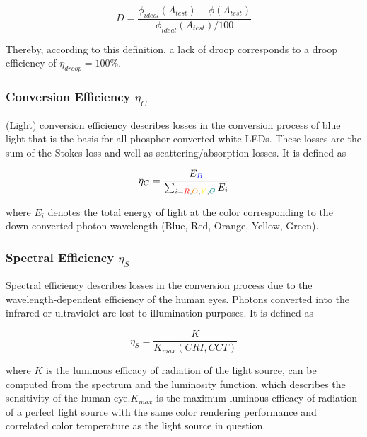 \documentclass[twoside,twocolumn,9pt]{article}
\begin{document}
\begin{equation}
\label{eqn:droop}
    D = \frac{\phi_{ideal}(A_{test})-\phi(A_{test})}{\phi_{ideal}(A_{test})/100}
\end{equation}

Thereby, according to this definition, a lack of droop corresponds to a droop efficiency of $\eta_{droop} = 100\%$\cite{schubert2018light}\cite{tsao2010solid}.

\subsubsection{Conversion Efficiency $\eta_{C}$}

(Light) conversion efficiency describes losses in the conversion process of blue light that is the basis for all phosphor-converted white LEDs. These losses are the sum of the Stokes loss and well as scattering/absorption losses. It is defined as

\begin{equation}
    \eta_{C} = \frac{E_{\textcolor{blue}{B}}}{\sum_{i=\textcolor{red}{R},\textcolor{orange}{O},\textcolor{yellow}{Y},\textcolor{teal}{G}} E_i}
\end{equation}

where $E_i$ denotes the total energy of light at the color corresponding to the down-converted photon wavelength (Blue, Red, Orange, Yellow, Green)\cite{schubert2018light}\cite{tsao2010solid}.

\subsubsection{Spectral Efficiency $\eta_{S}$}

Spectral efficiency describes losses in the conversion process due to the wavelength-dependent efficiency of the human eyes. Photons converted into the infrared or ultraviolet are lost to illumination purposes. It is defined as

\begin{equation}
    \eta_{S} = \frac{K}{K_{max}(CRI,CCT)}
\end{equation}

where $K$ is the luminous efficacy of radiation of the light source, can be computed from the spectrum and the luminosity function, which describes the sensitivity of the human eye.$K_{max}$ is the maximum luminous efficacy of radiation of a perfect light source with the same color rendering performance and correlated color temperature as the light source in question\cite{schubert2018light}\cite{tsao2010solid}. 
\end{document}
